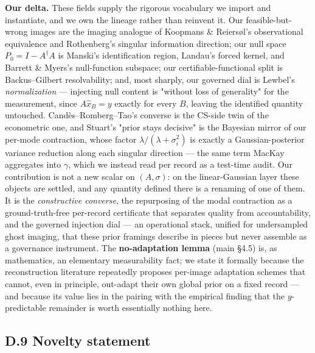 \documentclass[11pt]{article}
\begin{document}
\textbf{Our delta.} These fields supply the rigorous vocabulary we import and instantiate, and we own the lineage rather than reinvent it. Our feasible-but-wrong images are the imaging analogue of Koopmans \& Reiersøl's observational equivalence and Rothenberg's singular information direction; our null space $P_0 = I - A^\dagger A$ is Manski's identification region, Landau's forced kernel, and Barrett \& Myers's null-function subspace; our certifiable-functional split is Backus--Gilbert resolvability; and, most sharply, our governed dial is Lewbel's \textit{normalization} --- injecting null content is "without loss of generality" for the measurement, since $A\hat{x}_B = y$ exactly for every $B$, leaving the identified quantity untouched. Candès--Romberg--Tao's converse is the CS-side twin of the econometric one, and Stuart's "prior stays decisive" is the Bayesian mirror of our per-mode contraction, whose factor $\lambda/(\lambda+\sigma_i^2)$ is exactly a Gaussian-posterior variance reduction along each singular direction --- the same term MacKay aggregates into $\gamma$, which we instead read per record as a test-time audit. Our contribution is not a new scalar on $(A,\sigma)$: on the linear-Gaussian layer these objects are settled, and any quantity defined there is a renaming of one of them. It is the \textit{constructive converse}, the repurposing of the modal contraction as a ground-truth-free per-record certificate that separates quality from accountability, and the governed injection dial --- an operational stack, unified for undersampled ghost imaging, that these prior framings describe in pieces but never assemble as a governance instrument. The \textbf{no-adaptation lemma} (main §4.5) is, as mathematics, an elementary measurability fact; we state it formally because the reconstruction literature repeatedly proposes per-image adaptation schemes that cannot, even in principle, out-adapt their own global prior on a fixed record --- and because its value lies in the pairing with the empirical finding that the $y$-predictable remainder is worth essentially nothing here.

\subsection*{D.9 Novelty statement}
\end{document}
